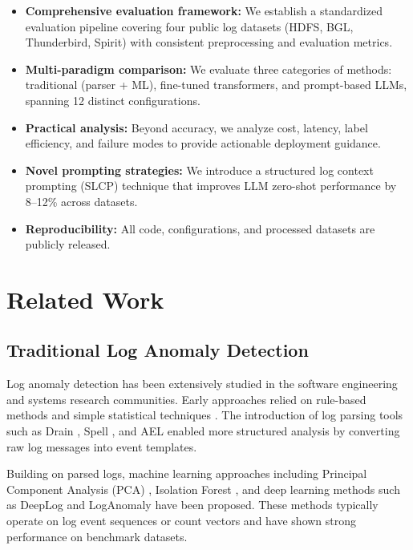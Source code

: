 \documentclass[conference]{IEEEtran}
\begin{document}
\begin{itemize}
    \item \textbf{Comprehensive evaluation framework:} We establish a standardized evaluation pipeline covering four public log datasets (HDFS, BGL, Thunderbird, Spirit) with consistent preprocessing and evaluation metrics.
    \item \textbf{Multi-paradigm comparison:} We evaluate three categories of methods: traditional (parser + ML), fine-tuned transformers, and prompt-based LLMs, spanning 12 distinct configurations.
    \item \textbf{Practical analysis:} Beyond accuracy, we analyze cost, latency, label efficiency, and failure modes to provide actionable deployment guidance.
    \item \textbf{Novel prompting strategies:} We introduce a structured log context prompting (SLCP) technique that improves LLM zero-shot performance by 8--12\% across datasets.
    \item \textbf{Reproducibility:} All code, configurations, and processed datasets are publicly released.
\end{itemize}

\section{Related Work}

\subsection{Traditional Log Anomaly Detection}

Log anomaly detection has been extensively studied in the software engineering and systems research communities. Early approaches relied on rule-based methods and simple statistical techniques \cite{xu2009detecting}. The introduction of log parsing tools such as Drain \cite{he2017drain}, Spell \cite{du2016spell}, and AEL \cite{jiang2008abstracting} enabled more structured analysis by converting raw log messages into event templates.

Building on parsed logs, machine learning approaches including Principal Component Analysis (PCA) \cite{xu2009detecting}, Isolation Forest \cite{liu2008isolation}, and deep learning methods such as DeepLog \cite{du2017deeplog} and LogAnomaly \cite{meng2019loganomaly} have been proposed. These methods typically operate on log event sequences or count vectors and have shown strong performance on benchmark datasets.
\end{document}
